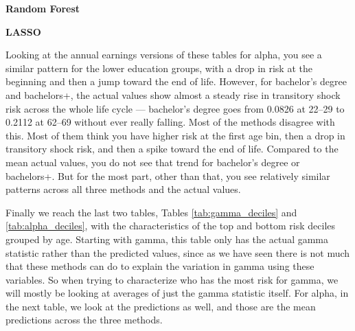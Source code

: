 \documentclass[12pt]{article}
\begin{document}
\begin{onehalfspace}
\begin{table}[H]
    \vspace{10pt}

    \begin{minipage}[t]{0.48\textwidth}
        \centering
        \textbf{Random Forest}\\[4pt]
        \resizebox{\linewidth}{!}{%
            
        }
    \end{minipage}\hfill
    \begin{minipage}[t]{0.48\textwidth}
        \centering
        \textbf{LASSO}\\[4pt]
        \resizebox{\linewidth}{!}{%
            
        }
    \end{minipage}
\end{table}

Looking at the annual earnings versions of these tables for alpha, you see a similar pattern for the lower education groups, with a drop in risk at the beginning and then a jump toward the end of life. However, for bachelor's degree and bachelors+, the actual values show almost a steady rise in transitory shock risk across the whole life cycle --- bachelor's degree goes from 0.0826 at 22--29 to 0.2112 at 62--69 without ever really falling. Most of the methods disagree with this. Most of them think you have higher risk at the first age bin, then a drop in transitory shock risk, and then a spike toward the end of life. Compared to the mean actual values, you do not see that trend for bachelor's degree or bachelors+. But for the most part, other than that, you see relatively similar patterns across all three methods and the actual values.

Finally we reach the last two tables, Tables \ref{tab:gamma_deciles} and \ref{tab:alpha_deciles}, with the characteristics of the top and bottom risk deciles grouped by age. Starting with gamma, this table only has the actual gamma statistic rather than the predicted values, since as we have seen there is not much that these methods can do to explain the variation in gamma using these variables. So when trying to characterize who has the most risk for gamma, we will mostly be looking at averages of just the gamma statistic itself. For alpha, in the next table, we look at the predictions as well, and those are the mean predictions across the three methods.


\end{onehalfspace}
\end{document}
